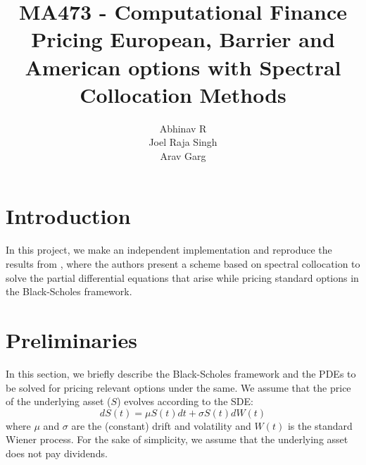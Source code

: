 \documentclass[a4paper,12pt]{article}
\title{MA473 - Computational Finance \\ Pricing European, Barrier and American options with Spectral Collocation Methods}
\author{Abhinav R \\ Joel Raja Singh \\ Arav Garg}
\date{}
\begin{document}
\maketitle

\newcommand{\bsm}{\frac{\partial V(S, \tau)}{\partial \tau} = rS\frac{\partial V(S, \tau)}{\partial S} + \frac{1}{2}\sigma^2\frac{\partial^2 V(S, \tau)}{\partial S^2} - rV(S, \tau)}
\newcommand{\bsmg}{\frac{\partial V(S, \tau)}{\partial \tau} = rS\frac{\partial V(S, \tau)}{\partial S} + \frac{1}{2}\sigma^2\frac{\partial^2 V(S, \tau)}{\partial S^2} - rV(S, \tau) + g(V(S, \tau))}
\newcommand{\R}{\mathbb{R}}
\newcommand{\norm}[1]{{\left \lVert #1 \right \rVert}_2}
\newcommand{\floor}[1]{\lfloor #1 \rfloor}
\newcommand{\er}{\operatorname{Error}_{m,N}(S)}

\section{Introduction}

In this project, we make an independent implementation and reproduce the results from \cite{col}, where the authors present a scheme based on spectral collocation to solve the partial differential equations that arise while pricing standard options in the Black-Scholes framework. 

\section{Preliminaries}

In this section, we briefly describe the Black-Scholes framework and the PDEs to be solved for pricing relevant options under the same. We assume that the price of the underlying asset ($S$) evolves according to the SDE:
\begin{equation}
    dS(t) = \mu S(t)dt + \sigma S(t) dW(t)
\end{equation}
where $\mu$ and $\sigma$ are the (constant) drift and volatility and $W(t)$ is the standard Wiener process. For the sake of simplicity, we assume that the underlying asset does not pay dividends. 
\end{document}
